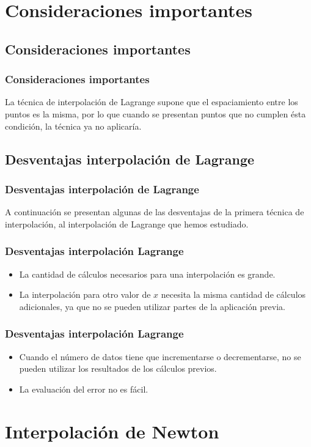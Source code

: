 \section{Consideraciones importantes}
\subsection{Consideraciones importantes}
\begin{frame}
\frametitle{Consideraciones importantes}
La técnica de interpolación de Lagrange supone que el espaciamiento entre los puntos es la misma, por lo que cuando se presentan puntos que no cumplen ésta condición, la técnica ya no aplicaría.
\end{frame}
\subsection{Desventajas interpolación de Lagrange}
\begin{frame}
\frametitle{Desventajas interpolación de Lagrange}
A continuación se presentan algunas de las desventajas de la primera técnica de interpolación, al interpolación de Lagrange que hemos estudiado.
\end{frame}
\begin{frame}
\frametitle{Desventajas interpolación Lagrange}
\begin{itemize}[<+->]
\item [\textcolor{red}{\xmark}] La cantidad de cálculos necesarios para una interpolación es grande.
\item [\textcolor{red}{\xmark}] La interpolación para otro valor de $x$ necesita la misma cantidad de cálculos adicionales, ya que no se pueden utilizar partes de la aplicación previa.
\end{itemize}
\end{frame}
\begin{frame}
\frametitle{Desventajas interpolación Lagrange}
\begin{itemize}[<+->]
\item [\textcolor{red}{\xmark}] Cuando el número de datos tiene que incrementarse o decrementarse, no se pueden utilizar los resultados de los cálculos previos.
\item [\textcolor{red}{\xmark}] La evaluación del error no es fácil.
\end{itemize}
\end{frame}
\section{Interpolación de Newton}

